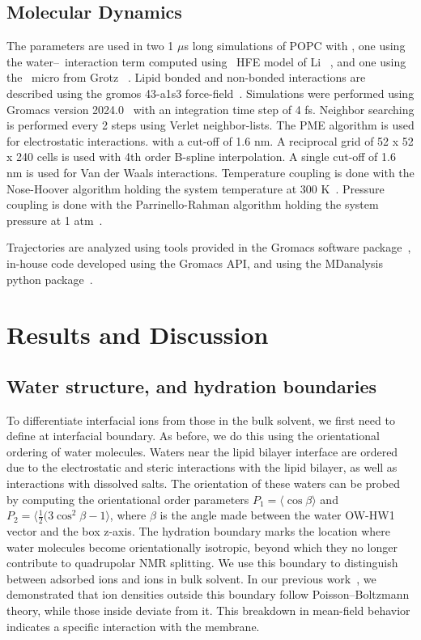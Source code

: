 \subsection{Molecular Dynamics}
The  parameters are used in
two 1 $\mu$s long simulations of POPC with \mgcl{}, one using the water--\mg~interaction term computed using \mg~HFE model of Li \etal~\cite{merzhfe}, and
one using the \mg~micro from Grotz \etal~\cite{grotz:2021:optimized,micro}. 
Lipid bonded and non-bonded interactions are described using the gromos 43-a1s3 force-field~\cite{chiu:2009}.
Simulations were performed using Gromacs version 
2024.0~\cite{gromacs}
with an integration time step of 4 fs.
Neighbor searching is performed every 2 steps using Verlet neighbor-lists.
The PME algorithm is used for electrostatic interactions.
with a cut-off of 1.6 nm.
A reciprocal grid of 52 x 52 x 240 cells is used with 4th order B-spline interpolation.
A single cut-off of 1.6 nm is used for Van der Waals interactions.
Temperature coupling is done with the Nose-Hoover algorithm holding the system temperature at 300 K~\cite{nose:1983}.
Pressure coupling is done with the Parrinello-Rahman algorithm holding the system pressure at 1 atm~\cite{parrinello:1981}.

Trajectories are analyzed using tools provided in the Gromacs software package~\cite{gromacs}, in-house code developed using the Gromacs API, and using the MDanalysis python package~\cite{mdanalysis1,mdanalysis2}.

\section{Results and Discussion}

\subsection{Water structure, and hydration boundaries}
To differentiate interfacial ions from those in the bulk solvent, we first need to define at interfacial boundary. As before\cite{saunders:2024}, we do this using the orientational ordering of water molecules. Waters near the lipid bilayer interface are ordered due to the electrostatic and steric interactions with the lipid bilayer, as well as interactions with dissolved salts. The
orientation of these waters can be probed by computing the orientational order parameters $P_1=\langle\cos{\beta}\rangle$ and $P_2=\langle{\frac{1}{2}(3\cos^{2}{\beta}-1}\rangle$, where $\beta$ is the angle made between the water OW-HW1 vector and the box z-axis. The hydration boundary marks the location where water molecules become orientationally isotropic, beyond which they no longer contribute to quadrupolar NMR splitting. We use this boundary to distinguish between adsorbed ions and ions in bulk solvent. In our previous work~\cite{saunders:2024}, we demonstrated that ion densities outside this boundary follow Poisson–Boltzmann theory, while those inside deviate from it. This breakdown in mean-field behavior indicates a specific interaction with the membrane. 

